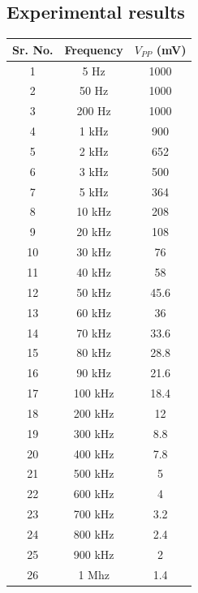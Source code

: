\documentclass[12pt]{article}
\begin{document}
\subsection{Experimental results}
\begin{table}[!hbt]
		\begin{center}
		\begin{tabular}{|c|c|c|}
			\hline
			Sr. No. & Frequency  & \(V_{PP}\) (mV) \\
			\hline
			1 & 5 Hz & 1000  \\
			\hline
                2 & 50 Hz & 1000  \\
			\hline
                3 & 200 Hz & 1000  \\
			\hline
                4 & 1 kHz & 900  \\
			\hline
                5 & 2 kHz & 652  \\
			\hline
                6 & 3 kHz &  500 \\
			\hline
                7 & 5 kHz &  364 \\
			\hline
                8 & 10 kHz &  208 \\
			\hline
                9 & 20 kHz &  108 \\
			\hline
                10 & 30 kHz &  76 \\
			\hline
                11 & 40 kHz &  58 \\
			\hline
                12 & 50 kHz &  45.6 \\
			\hline
                13 & 60 kHz & 36  \\
			\hline
                14 & 70 kHz &  33.6 \\
			\hline
                15 & 80 kHz & 28.8  \\
			\hline
                16 & 90 kHz &  21.6 \\
			\hline
                17 & 100 kHz & 18.4  \\
			\hline
                18 & 200 kHz & 12  \\
			\hline
                19 & 300 kHz & 8.8  \\
			\hline
                20 & 400 kHz &  7.8 \\
			\hline
                21 & 500 kHz & 5  \\
			\hline
                22 & 600 kHz & 4  \\
			\hline
                23 & 700 kHz & 3.2  \\
			\hline
                24 & 800 kHz &  2.4 \\
			\hline
                25 & 900 kHz &  2 \\
			\hline
                26 & 1 Mhz &  1.4 \\
			\hline
		\end{tabular}
		\end{center}
\end{table}
\end{document}
